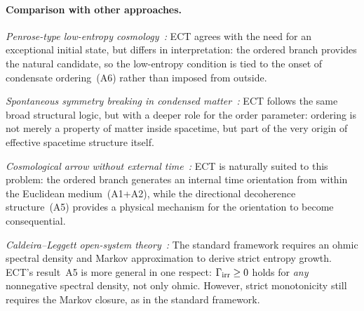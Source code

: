 \documentclass[11pt,a4paper]{article}
\numberwithin{equation}{section}
\begin{document}
\paragraph{Comparison with other approaches.}

\emph{Penrose-type low-entropy cosmology~\cite{Penrose2010}:}
ECT agrees with the need for an exceptional initial state, but differs
in interpretation: the ordered branch provides the natural
candidate, so the low-entropy condition is tied to the onset of
condensate ordering~(A6) rather than imposed from outside.

\emph{Spontaneous symmetry breaking in condensed
matter~\cite{Volovik2003}:}
ECT follows the same broad structural logic, but with a deeper role for
the order parameter: ordering is not merely a property of matter inside
spacetime, but part of the very origin of effective spacetime structure
itself.

\emph{Cosmological arrow without external time~\cite{Barbour1994}:}
ECT is naturally suited to this problem: the ordered branch generates
an internal time orientation from within the Euclidean medium~(A1+A2),
while the directional decoherence structure~(A5) provides a physical
mechanism for the orientation to become consequential.

\emph{Caldeira--Leggett open-system theory~\cite{CaldeiraLeggett1983}:}
The standard framework requires an ohmic spectral density and Markov
approximation to derive strict entropy growth.
ECT's result~A5 is more general in one respect: $\Gamma_{\rm irr}\geq 0$
holds for \emph{any} nonnegative spectral density, not only ohmic.
However, strict monotonicity still requires the Markov closure, as in the
standard framework.
\end{document}
